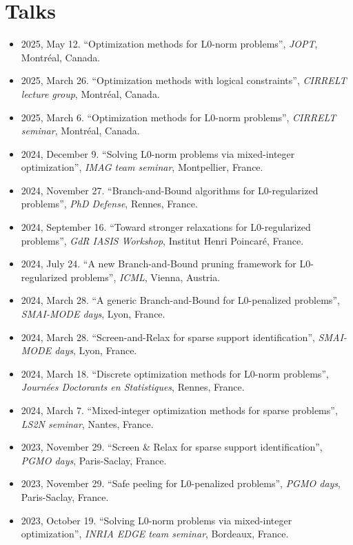 \section{Talks}

\begin{itemize}
    \item 2025, May 12. ``Optimization methods for L0-norm problems'', \textit{JOPT}, Montréal, Canada.
    \item 2025, March 26. ``Optimization methods with logical constraints'', \textit{CIRRELT lecture group}, Montréal, Canada.
    \item 2025, March 6. ``Optimization methods for L0-norm problems'', \textit{CIRRELT seminar}, Montréal, Canada.
    \item 2024, December 9. ``Solving L0-norm problems via mixed-integer optimization'', \textit{IMAG team seminar}, Montpellier, France.
    \item 2024, November 27. ``Branch-and-Bound algorithms for L0-regularized problems'', \textit{PhD Defense}, Rennes, France.
    \item 2024, September 16. ``Toward stronger relaxations for L0-regularized problems'', \textit{GdR IASIS Workshop}, Institut Henri Poincaré, France.
    \item 2024, July 24. ``A new Branch-and-Bound pruning framework for L0-regularized problems'', \textit{ICML}, Vienna, Austria.
    \item 2024, March 28. ``A generic Branch-and-Bound for L0-penalized problems'', \textit{SMAI-MODE days}, Lyon, France.
    \item 2024, March 28. ``Screen-and-Relax for sparse support identification'', \textit{SMAI-MODE days}, Lyon, France.
    \item 2024, March 18. ``Discrete optimization methods for L0-norm problems'', \textit{Journées Doctorants en Statistiques}, Rennes, France.
    \item 2024, March 7. ``Mixed-integer optimization methods for sparse problems'', \textit{LS2N seminar}, Nantes, France.
    \item 2023, November 29. ``Screen \& Relax for sparse support identification'', \textit{PGMO days}, Paris-Saclay, France.
    \item 2023, November 29. ``Safe peeling for L0-penalized problems'', \textit{PGMO days}, Paris-Saclay, France.
    \item 2023, October 19. ``Solving L0-norm problems via mixed-integer optimization'', \textit{INRIA EDGE team seminar}, Bordeaux, France.

\end{itemize}

